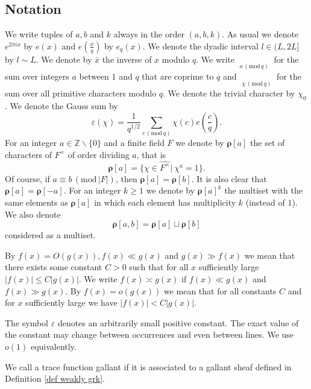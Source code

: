 \documentclass[12pt]{amsart}
\theoremstyle{plain}
\theoremstyle{definition}
\theoremstyle{remark}
\numberwithin{equation}{section}
\newcommand{\ZZ}{\mathbb{Z}}
\newcommand\sumst{\mathop{{\sum}^\ast}\limits}
\newcommand{\mods}[1]{\,(\mathrm{mod}\,{#1})}
\renewcommand{\geq}{\geqslant}
\renewcommand{\leq}{\leqslant}
\begin{document}
\subsection*{Notation}
We write tuples of $a,b$ and $k$ always in the order $(a,b,k)$. As usual we denote $e^{2\pi i x}$ by $e(x)$ and $e\left(\frac{x}{q}\right)$ by $e_q(x)$.  
We denote the dyadic interval $l\in(L,2L]$ by $l\sim L$. 
We denote by $\bar x$ the inverse of $x$ modulo $q$.
We write $\sumst_{a\mods q}$ for the sum over integers $a$ between $1$ and $q$ that are coprime to $q$ and $\sumst_{\chi\mods q}$ for the sum over all primitive characters modulo $q$. We denote the trivial character by $\chi_0$.
We denote the Gauss sum by $$\varepsilon(\chi)=\frac{1}{q^{1/2}}\sum_{c\mods q}\chi(c)e\left(\frac cq\right).$$
For an integer $a \in \ZZ\smallsetminus\{0\}$ and a finite field $F$ we denote by $\bm{\rho}[a]$ the set of characters of $F^{\times}$ of order dividing $a$, that is $$\bm{\rho}[a] = \{\chi \in \widehat{F^{\times}}|\ \chi^a=1\}.$$ Of course, if $a \equiv b \mods{\vert{F}\vert}$, then $\bm{\rho}[a] = \bm{\rho}[b]$. It is also clear that $\bm{\rho}[a]=\bm{\rho}[-a]$.
For an integer $k\geq 1$ we denote by $\bm{\rho}[a]^k$ the multiset with the same elements as $\bm{\rho}[a]$ in which each element has multiplicity $k$ (instead of $1$). We also denote 
$$\bm{\rho}[a,b] = \bm{\rho}[a]\sqcup\bm{\rho}[b]$$ considered as a multiset.


By $f(x) = O(g(x)), f(x) \ll g(x)$ and $g(x) \gg f(x)$ we mean that there exists some constant $C > 0$ such that for all $x$ sufficiently large $|f(x)| \leq C|g(x)|$. We write $f(x)\asymp g(x)$ if $f(x)\ll g(x)$ and $f(x)\gg g(x)$.
By $f(x)=o(g(x))$ we mean that for all constants $C$ and for $x$ sufficiently large we have $|f(x)|<C|g(x)|$.

The symbol $\varepsilon$ denotes an arbitrarily small positive constant. The exact value of the constant may change between occurrences and even between lines. We use $o(1)$ equivalently. 

We call a trace function gallant if it is associated to a gallant sheaf defined in Definition \ref{def weakly grk}.
\end{document}
